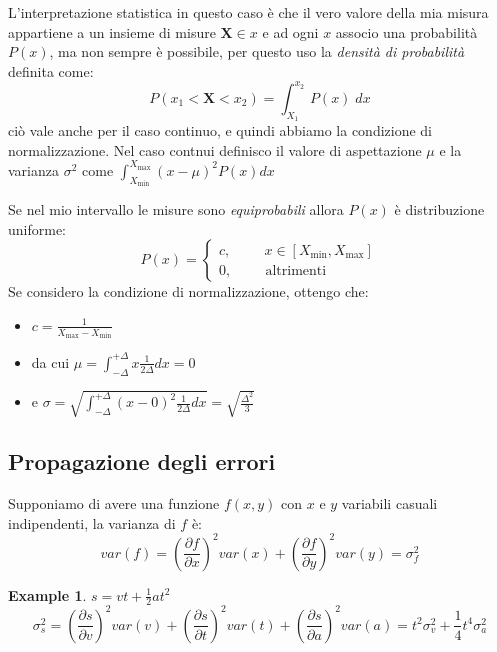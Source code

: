 \documentclass{article}
\newtheorem{example}{Example}
\begin{document}
L'interpretazione statistica in questo caso è che il vero valore della mia misura appartiene a un insieme di misure $ \mathbf{X} \in {x}$ 
e ad ogni $x$ associo una probabilità $P(x)$, ma non sempre è possibile, per questo uso la \textit{densità di probabilità} definita come:
\[
P(x_1 < \mathbf{X} < x_2) = \int_{X_1}^{x_2} P(x) \; dx
\]
ciò vale anche per il caso continuo, e quindi abbiamo la condizione di normalizzazione.
Nel caso contnui definisco il valore di aspettazione $\mu$ e la varianza $\sigma^2$ come $\displaystyle \int_{X_{\min}}^{X_{\max}}(x - \mu)^2 P(x) dx$ 

Se nel mio intervallo le misure sono \textit{equiprobabili} allora $P(x)$ è distribuzione uniforme:
\[
P(x)=
\begin{cases}
    c , \hspace{1cm} x \in [X_{\min}, X_{\max}] \\
    0 , \hspace{1cm} \text{altrimenti}
\end{cases}
\]
Se considero la condizione di normalizzazione, ottengo che:
\begin{itemize}
    \item $\displaystyle c = \frac{1}{X_{\max} - X_{\min}}$
    \item da cui $\displaystyle \mu = \int_{-\Delta}^{+\Delta} x \frac{1}{2 \Delta } dx = 0$
    \item e $\displaystyle \sigma = \sqrt{\int_{-\Delta}^{+\Delta} (x - 0)^2 \frac{1}{2 \Delta } dx} = \sqrt{\frac{\Delta^2}{3}}$
\end{itemize}

\subsection{Propagazione degli errori}
Supponiamo di avere una funzione $f(x,y)$ con $x$ e $y$ variabili casuali indipendenti, la varianza di $f$ è:
\[
var(f) = \left(\frac{\partial f}{\partial x}\right)^2 var(x)+ \left( \frac{\partial f}{\partial y} \right)^2 var(y) = \sigma_f^2
\]
\begin{example}
$s = vt + \frac{1}{2} a t^2$
\[
\sigma_s^2 = \left(\frac{\partial s}{\partial v}\right)^2 var(v)+ \left( \frac{\partial s}{\partial t} \right)^2 var(t) + \left( \frac{\partial s}{\partial a} \right)^2 var(a) = t^2 \sigma_v^2 + \frac{1}{4} t^4 \sigma_a^2
\]
\end{example}
\end{document}
